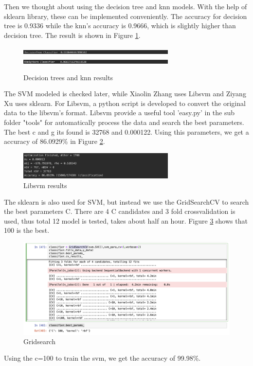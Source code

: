 \documentclass[11pt,en]{elegantpaper}
\begin{document}
Then we thought about using the decision tree and knn models. With the help of sklearn library, these can be implemented conveniently. The accuracy for decision tree is 0.9336 while the knn's accuracy is 0.9666, which is slightly higher than decision tree. The result is shown in Figure \ref{dtknn}.
\begin{figure}[H]
	\centering
	\includegraphics[width=0.7\textwidth]{image/dt.png}
	\includegraphics[width=0.7\textwidth]{image/knn.png}
	\caption{Decision trees and knn results}
	\label{dtknn}
\end{figure}
The SVM modeled is checked later, while Xiaolin Zhang uses Libsvm and Ziyang Xu uses sklearn. For Libsvm, a python script is developed to convert the original data to the libsvm's format. Libsvm provide a useful tool 'easy.py' in the sub folder "tools" for automatically process the data and search the best parameters. The best c and g its found is 32768 and 0.000122. Using this parameters, we get a accuracy of 86.0929\% in Figure \ref{libsvm}.
\begin{figure}[h]
	\centering
	\includegraphics[width=0.7\textwidth]{image/libsvm.png}
	\caption{Libsvm results}
	\label{libsvm}
\end{figure}
The sklearn is also used for SVM, but instead we use the GridSearchCV to search the best parameters C. There are 4 C candidates and 3 fold crossvalidation is used, thus total 12 model is tested, takes about half an hour. Figure \ref{gridsearch} shows that 100 is the best.
\begin{figure}[h]
	\centering
	\includegraphics[width=1\textwidth]{image/image-20200523231303921.png}
	\caption{Gridsearch}
	\label{gridsearch}
\end{figure}
Using the c=100 to train the svm, we get the accuracy of 99.98\%.
\end{document}
